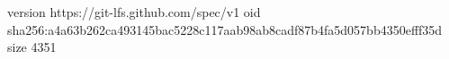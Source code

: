 version https://git-lfs.github.com/spec/v1
oid sha256:a4a63b262ca493145bac5228c117aab98ab8cadf87b4fa5d057bb4350efff35d
size 4351
